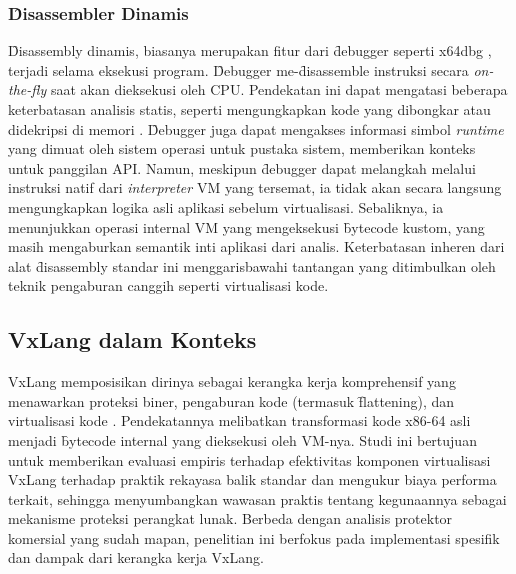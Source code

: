 \subsubsection{\f{Disassembler} Dinamis}
\f{Disassembly} dinamis, biasanya merupakan fitur dari \f{debugger} seperti x64dbg \cite{Dun14}, terjadi selama eksekusi program. \f{Debugger} me-\f{disassemble} instruksi secara \textit{on-the-fly} saat akan dieksekusi oleh CPU. Pendekatan ini dapat mengatasi beberapa keterbatasan analisis statis, seperti mengungkapkan kode yang dibongkar atau didekripsi di memori \cite{Sikorski2012}. \f{Debugger} juga dapat mengakses informasi simbol \textit{runtime} yang dimuat oleh sistem operasi untuk pustaka sistem, memberikan konteks untuk panggilan API. Namun, meskipun \f{debugger} dapat melangkah melalui instruksi natif dari \textit{interpreter} VM yang tersemat, ia tidak akan secara langsung mengungkapkan logika asli aplikasi sebelum virtualisasi. Sebaliknya, ia menunjukkan operasi internal VM yang mengeksekusi \f{bytecode} kustom, yang masih mengaburkan semantik inti aplikasi dari analis. Keterbatasan inheren dari alat \f{disassembly} standar ini menggarisbawahi tantangan yang ditimbulkan oleh teknik pengaburan canggih seperti virtualisasi kode.

\subsection{VxLang dalam Konteks}
VxLang memposisikan dirinya sebagai kerangka kerja komprehensif yang menawarkan proteksi biner, pengaburan kode (termasuk \f{flattening}), dan virtualisasi kode \cite{VxLang}. Pendekatannya melibatkan transformasi kode x86-64 asli menjadi \f{bytecode} internal yang dieksekusi oleh VM-nya. Studi ini bertujuan untuk memberikan evaluasi empiris terhadap efektivitas komponen virtualisasi VxLang terhadap praktik rekayasa balik standar dan mengukur biaya performa terkait, sehingga menyumbangkan wawasan praktis tentang kegunaannya sebagai mekanisme proteksi perangkat lunak. Berbeda dengan analisis protektor komersial yang sudah mapan, penelitian ini berfokus pada implementasi spesifik dan dampak dari kerangka kerja VxLang.
